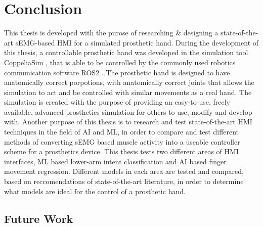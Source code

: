 \documentclass[../main.tex]{subfiles}
\begin{document}
\section{Conclusion}

This thesis is developed with the purose of researching \& designing a state-of-the-art sEMG-based HMI for a simulated prosthetic hand.
During the development of this thesis, a controllable prosthetic hand was developed in the simulation tool CoppeliaSim \cite{coppeliasim}, that is able to be controlled by the commonly used robotics communication software ROS2 \cite{ros2}.
The prosthetic hand is designed to have anatomically correct porpotions, with anatomically correct joints that allows the simulation to act and be controlled with similar movements as a real hand. 
The simulation is created with the purpose of providing an easy-to-use, freely available, advanced prosthetics simulation for others to use, modify and develop with. 
Another purpose of this thesis is to research and test state-of-the-art HMI techniques in the field of AI and ML, in order to compare and test different methods of converting sEMG based muscle activity into a useable controller scheme for a prosthetics device.
This thesis tests two different areas of HMI interfaces, ML based lower-arm intent classification and AI based finger movement regression.
Different models in each area are tested and compared, based on reccomendations of state-of-the-art
literature, in order to determine what models are ideal for the control of a prosthetic hand.



\subsection{Future Work}
\end{document}
